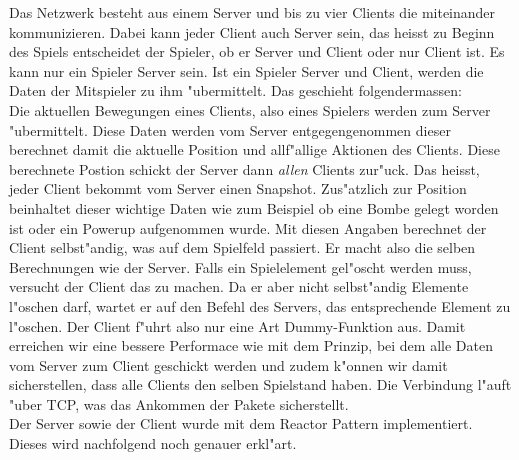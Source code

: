 Das Netzwerk besteht aus einem Server und bis zu vier Clients die miteinander kommunizieren. Dabei kann jeder Client auch Server sein, das heisst
zu Beginn des Spiels entscheidet der Spieler, ob er Server und Client oder nur Client ist. Es kann nur ein Spieler Server sein.
Ist ein Spieler Server und Client, werden die Daten der Mitspieler zu ihm "ubermittelt. Das geschieht folgendermassen: \\
Die aktuellen Bewegungen eines Clients, also eines Spielers werden zum Server "ubermittelt. Diese Daten werden vom Server
entgegengenommen dieser berechnet damit die aktuelle Position und allf"allige Aktionen des Clients. Diese berechnete Postion schickt der Server dann \textit{allen} Clients
zur"uck. Das heisst, jeder Client bekommt vom Server einen Snapshot. Zus"atzlich zur Position beinhaltet dieser wichtige Daten wie zum Beispiel ob
eine Bombe gelegt worden ist oder ein Powerup aufgenommen wurde. Mit diesen Angaben berechnet der Client selbst"andig, was auf dem
Spielfeld passiert. Er macht also die selben Berechnungen wie der Server. Falls ein Spielelement gel"oscht werden muss,
versucht der Client das zu machen. Da er aber nicht selbst"andig Elemente l"oschen darf, wartet er auf den Befehl des Servers,
das entsprechende Element zu l"oschen. Der Client f"uhrt also nur eine Art Dummy-Funktion aus.
Damit erreichen wir eine bessere Performace wie mit dem Prinzip, bei dem alle Daten vom Server zum Client geschickt werden und zudem
k"onnen wir damit sicherstellen, dass alle Clients den selben Spielstand haben. Die Verbindung l"auft "uber TCP, was das Ankommen
der Pakete sicherstellt. \\
Der Server sowie der Client wurde mit dem Reactor Pattern implementiert. Dieses wird nachfolgend noch genauer erkl"art.

